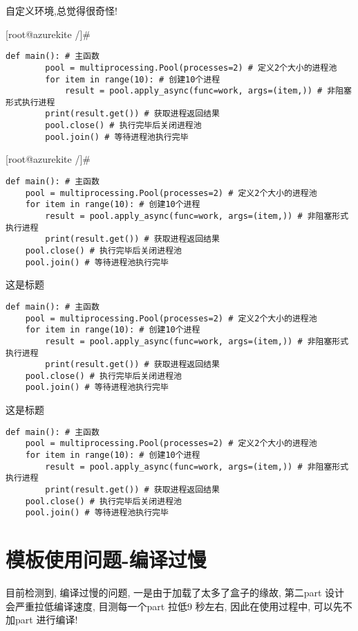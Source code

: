 自定义环境,总觉得很奇怪!
\begin{mycmd2}{[root@azurekite /]\#}
    \begin{lstlisting}[style=python2]
def main(): # 主函数
        pool = multiprocessing.Pool(processes=2) # 定义2个大小的进程池
        for item in range(10): # 创建10个进程
            result = pool.apply_async(func=work, args=(item,)) # 非阻塞形式执行进程
        print(result.get()) # 获取进程返回结果
        pool.close() # 执行完毕后关闭进程池
        pool.join() # 等待进程池执行完毕
    \end{lstlisting}
\end{mycmd2}

\begin{tcblisting}{}
\begin{mycmd2}{[root@azurekite /]\#}
\begin{lstlisting}[style=python2]
def main(): # 主函数
    pool = multiprocessing.Pool(processes=2) # 定义2个大小的进程池
    for item in range(10): # 创建10个进程
        result = pool.apply_async(func=work, args=(item,)) # 非阻塞形式执行进程
        print(result.get()) # 获取进程返回结果
    pool.close() # 执行完毕后关闭进程池
    pool.join() # 等待进程池执行完毕
\end{lstlisting}
\end{mycmd2}
\end{tcblisting}

\begin{macbox}{这是标题}
\begin{lstlisting}[style=python4]
def main(): # 主函数
    pool = multiprocessing.Pool(processes=2) # 定义2个大小的进程池
    for item in range(10): # 创建10个进程
        result = pool.apply_async(func=work, args=(item,)) # 非阻塞形式执行进程
        print(result.get()) # 获取进程返回结果
    pool.close() # 执行完毕后关闭进程池
    pool.join() # 等待进程池执行完毕
\end{lstlisting}
\end{macbox}

\begin{macboxd}{这是标题}
\begin{lstlisting}[style=python3]
def main(): # 主函数
    pool = multiprocessing.Pool(processes=2) # 定义2个大小的进程池
    for item in range(10): # 创建10个进程
        result = pool.apply_async(func=work, args=(item,)) # 非阻塞形式执行进程
        print(result.get()) # 获取进程返回结果
    pool.close() # 执行完毕后关闭进程池
    pool.join() # 等待进程池执行完毕
\end{lstlisting}
\end{macboxd}

\section{模板使用问题-编译过慢}
目前检测到, 编译过慢的问题, 一是由于加载了太多了盒子的缘故,
第二part 设计会严重拉低编译速度, 目测每一个part 拉低9 秒左右, 因此在使用过程中, 可以先不加part 进行编译!